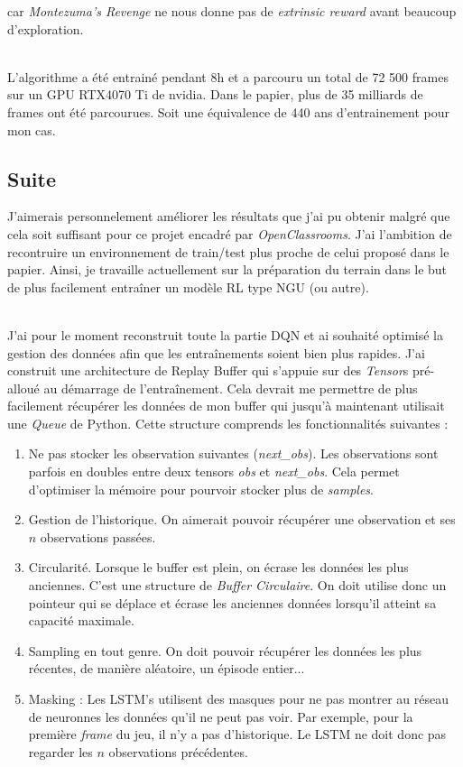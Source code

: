 car \textit{Montezuma's Revenge} ne nous donne pas de \textit{extrinsic reward} avant beaucoup d'exploration.

~\\
L'algorithme a été entrainé pendant 8h et a parcouru un total de 72 500 frames sur un GPU RTX4070 Ti de nvidia. Dans le papier, plus de 35 milliards de frames ont été parcourues. Soit une équivalence de 440 ans d'entrainement pour mon cas.

\subsection{Suite}

J'aimerais personnelement améliorer les résultats que j'ai pu obtenir malgré que cela soit suffisant pour ce projet encadré par \textit{OpenClassrooms}. J'ai l'ambition de recontruire un environnement de train/test plus proche de celui proposé dans le papier. Ainsi, je travaille actuellement sur la préparation du terrain dans le but de plus facilement entraîner un modèle RL type NGU (ou autre).

~\\
J'ai pour le moment reconstruit toute la partie DQN et ai souhaité optimisé la gestion des données afin que les entraînements soient bien plus rapides.
J'ai construit une architecture de Replay Buffer qui s'appuie sur des \textit{Tensor}s pré-alloué au démarrage de l'entraînement. Cela devrait me permettre de plus facilement récupérer les données de mon buffer qui jusqu'à maintenant utilisait une \textit{Queue} de Python.
Cette structure comprends les fonctionnalités suivantes :
\begin{enumerate}
    \item Ne pas stocker les observation suivantes (\textit{next\_obs}). Les observations sont parfois en doubles entre deux tensors \textit{obs} et \textit{next\_obs}. Cela permet d'optimiser la mémoire pour pourvoir stocker plus de \textit{samples}.
    \item Gestion de l'historique. On aimerait pouvoir récupérer une observation et ses $n$ observations passées.
    \item Circularité. Lorsque le buffer est plein, on écrase les données les plus anciennes. C'est une structure de \textit{Buffer Circulaire}. On doit utilise donc un pointeur qui se déplace et écrase les anciennes données lorsqu'il atteint sa capacité maximale.
    \item Sampling en tout genre. On doit pouvoir récupérer les données les plus récentes, de manière aléatoire, un épisode entier...
    \item Masking : Les LSTM's utilisent des masques pour ne pas montrer au réseau de neuronnes les données qu'il ne peut pas voir. Par exemple, pour la première \textit{frame} du jeu, il n'y a pas d'historique. Le LSTM ne doit donc pas regarder les $n$ observations précédentes.
\end{enumerate}

